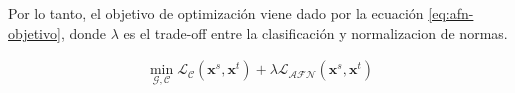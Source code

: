 Por lo tanto, el objetivo de optimización viene dado por la ecuación \ref{eq:afn-objetivo}, donde $\lambda$ es el
trade-off entre la clasificación y normalizacion de normas.

\begin{align}
    \min_{\mathcal{G}, \mathcal{C}} \mathcal{L}_{\mathcal{C}}(\mathbf{x}^s, \mathbf{x}^t) + \lambda \mathcal{L}_{\mathcal{AFN}}(\mathbf{x}^s, \mathbf{x}^t)
    \label{eq:afn-objetivo}
\end{align}